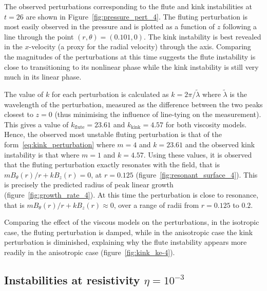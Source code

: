 \documentclass[fleqn,usenatbib]{mnras}
\newcommand{\rs}[2]{{#2}}
\begin{document}
\rs{Figure~\ref{fig:pressure_pert_4} plots the }{The} observed
  perturbations corresponding to the flute and kink
  instabilities at $t=26$ \rs{}{are shown in
  Figure~\ref{fig:pressure_pert_4}}. The fluting perturbation is
  most easily observed in the pressure and is plotted as a function of $z$
  following a line through the point $(r, \theta) = (0.101, 0)$. The
  kink instability is best revealed in the $x$-velocity (a proxy for the
  radial velocity) through the axis. Comparing the magnitudes of the
  perturbations at this time suggests the flute
  instability is close to transitioning to its nonlinear phase while
  the kink instability is still very much in its linear
  phase.

The value of $k$ for each perturbation is calculated as $k = 2\pi/\tilde{\lambda}$ where $\tilde{\lambda}$ is the wavelength of the perturbation, measured as the difference between the two peaks closest to $z=0$ (thus minimising the influence of line-tying on the measurement). This gives a value of $k_{\rs{flute}{\text{flute}}}=23.61$ and $k_{\rs{kink}{\text{kink}}}=4.57$ for both viscosity models. Hence, the observed most unstable fluting perturbation is that of the form~\eqref{eq:kink_perturbation} where $m=4$ and $k=23.61$ and the observed kink instability is that where $m=1$ and $k=4.57$. Using these values, it is observed that the fluting perturbation exactly resonates with the field, that is $m B_{\theta}(r)/r + kB_z(r) = 0$, at $r=0.125$ (figure~\ref{fig:resonant_surface_4}). This is precisely the predicted radius of peak linear growth (figure~\ref{fig:growth_rate_4}). At this time the perturbation is close to resonance, that is $m B_{\theta}(r)/r + kB_z(r) \approx 0$, over a range of radii from $r=0.125$ to $0.2$.

Comparing the effect of the viscous models on the perturbations, in the isotropic case, the fluting perturbation is damped, while in the \rs{switching}{anisotropic} case the kink perturbation is diminished, explaining why the flute instability appears more readily in the \rs{switching}{anisotropic} case (figure~\ref{fig:kink_ke-4}).

\subsection{\rs{Development where}{Instabilities at resistivity} $\eta=10^{-3}$}
\end{document}
